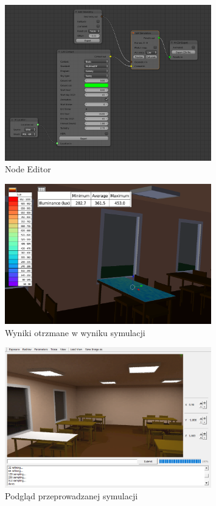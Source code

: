 \documentclass[a4paper,12pt]{article}
\begin{document}
	\begin{figure}[!ht]
	\centering
	\includegraphics[width=0.8\textwidth]{node_editor}
	\caption{Node Editor}
	\label{node_editor}
	\end{figure}

	\begin{figure}[!ht]
		\centering
		\includegraphics[width=0.8\textwidth]{wynik_symulacji}
		\caption{Wyniki otrzmane w wyniku symulacji}
		\label{wynik_symulacji}
	\end{figure}

	\begin{figure}[!ht]
		\centering
		\includegraphics[width=0.8\textwidth]{podglad_symulacji}
		\caption{Podgląd przeprowadzanej symulacji}
		\label{podglad_symulacji}
	\end{figure}
\end{document}
